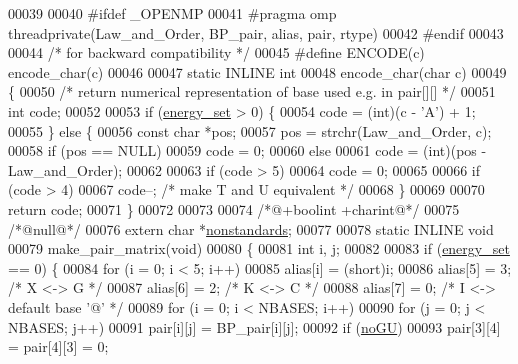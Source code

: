 \begin{DoxyCode}
00039 
00040 \textcolor{preprocessor}{#ifdef \_OPENMP}
00041 \textcolor{preprocessor}{#pragma omp threadprivate(Law\_and\_Order, BP\_pair, alias, pair, rtype)}
00042 \textcolor{preprocessor}{#endif}
00043 
00044 \textcolor{comment}{/* for backward compatibility */}
00045 \textcolor{preprocessor}{#define ENCODE(c) encode\_char(c)}
00046 
00047 \textcolor{keyword}{static} INLINE \textcolor{keywordtype}{int}
00048 encode\_char(\textcolor{keywordtype}{char} c)
00049 \{
00050   \textcolor{comment}{/* return numerical representation of base used e.g. in pair[][] */}
00051   \textcolor{keywordtype}{int} code;
00052 
00053   \textcolor{keywordflow}{if} (\hyperlink{group__model__details_gafb1ef1166da85092ae8a325e02dcae71}{energy\_set} > 0) \{
00054     code = (int)(c - \textcolor{charliteral}{'A'}) + 1;
00055   \} \textcolor{keywordflow}{else} \{
00056     \textcolor{keyword}{const} \textcolor{keywordtype}{char} *pos;
00057     pos = strchr(Law\_and\_Order, c);
00058     \textcolor{keywordflow}{if} (pos == NULL)
00059       code = 0;
00060     \textcolor{keywordflow}{else}
00061       code = (int)(pos - Law\_and\_Order);
00062 
00063     \textcolor{keywordflow}{if} (code > 5)
00064       code = 0;
00065 
00066     \textcolor{keywordflow}{if} (code > 4)
00067       code--;           \textcolor{comment}{/* make T and U equivalent */}
00068   \}
00069 
00070   \textcolor{keywordflow}{return} code;
00071 \}
00072 
00073 
00074 \textcolor{comment}{/*@+boolint +charint@*/}
00075 \textcolor{comment}{/*@null@*/}
00076 \textcolor{keyword}{extern} \textcolor{keywordtype}{char} *\hyperlink{group__model__details_ga2695d91cc535d09c2eae5c3884e2ec64}{nonstandards};
00077 
00078 \textcolor{keyword}{static} INLINE \textcolor{keywordtype}{void}
00079 make\_pair\_matrix(\textcolor{keywordtype}{void})
00080 \{
00081   \textcolor{keywordtype}{int} i, j;
00082 
00083   \textcolor{keywordflow}{if} (\hyperlink{group__model__details_gafb1ef1166da85092ae8a325e02dcae71}{energy\_set} == 0) \{
00084     \textcolor{keywordflow}{for} (i = 0; i < 5; i++)
00085       alias[i] = (\textcolor{keywordtype}{short})i;
00086     alias[5]  = 3;  \textcolor{comment}{/* X <-> G */}
00087     alias[6]  = 2;  \textcolor{comment}{/* K <-> C */}
00088     alias[7]  = 0;  \textcolor{comment}{/* I <-> default base '@' */}
00089     \textcolor{keywordflow}{for} (i = 0; i < NBASES; i++)
00090       \textcolor{keywordflow}{for} (j = 0; j < NBASES; j++)
00091         pair[i][j] = BP\_pair[i][j];
00092     \textcolor{keywordflow}{if} (\hyperlink{group__model__details_gabf380d09e4f1ab94fc6af57cf0ad5d32}{noGU})
00093       pair[3][4] = pair[4][3] = 0;

\end{DoxyCode}
